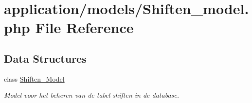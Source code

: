 \hypertarget{_shiften__model_8php}{}\section{application/models/\+Shiften\+\_\+model.php File Reference}
\label{_shiften__model_8php}
\subsection*{Data Structures}
\begin{DoxyCompactItemize}
\item 
class \mbox{\hyperlink{class_shiften___model}{Shiften\+\_\+\+Model}}
\begin{DoxyCompactList}\small\item\em Model voor het beheren van de tabel shiften in de database. \end{DoxyCompactList}\end{DoxyCompactItemize}
